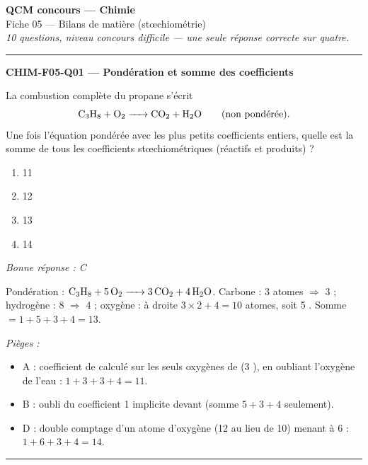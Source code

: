 \documentclass[11pt,a4paper]{article}
\begin{document}
\begin{center}
{\Large\bfseries QCM concours --- Chimie}\\[2pt]
{\large Fiche 05 --- Bilans de matière (stœchiométrie)}\\[2pt]
\textit{10 questions, niveau concours difficile --- une seule réponse correcte sur quatre.}
\end{center}
\vspace{6pt}\hrule\vspace{10pt}

\noindent\textbf{CHIM-F05-Q01 --- Pondération et somme des coefficients}\par
La combustion complète du propane s'écrit
\[\ce{C3H8 + O2 -> CO2 + H2O}\qquad\text{(non pondérée).}\]
Une fois l'équation pondérée avec les plus petits coefficients entiers, quelle est la somme de tous les coefficients stœchiométriques (réactifs et produits) ?
\begin{enumerate}[label=\Alph*)]
\item \num{11}
\item \num{12}
\item \num{13}
\item \num{14}
\end{enumerate}
\textit{Bonne réponse : C}\par
Pondération : $\ce{C3H8 + 5 O2 -> 3 CO2 + 4 H2O}$. Carbone : \num{3} atomes $\Rightarrow$ \num{3}  ; hydrogène : \num{8} $\Rightarrow$ \num{4}  ; oxygène : à droite $\num{3}\times\num{2}+\num{4}=\num{10}$ atomes, soit \num{5} . Somme $=\num{1}+\num{5}+\num{3}+\num{4}=\num{13}$.\par
\textit{Pièges :}
\begin{itemize}
\item A : coefficient de  calculé sur les seuls oxygènes de  (\num{3} ), en oubliant l'oxygène de l'eau : $\num{1}+\num{3}+\num{3}+\num{4}=\num{11}$.
\item B : oubli du coefficient \num{1} implicite devant  (somme $\num{5}+\num{3}+\num{4}$ seulement).
\item D : double comptage d'un atome d'oxygène (\num{12} au lieu de \num{10}) menant à \num{6}  : $\num{1}+\num{6}+\num{3}+\num{4}=\num{14}$.
\end{itemize}
\vspace{6pt}\hrule\vspace{8pt}
\end{document}
